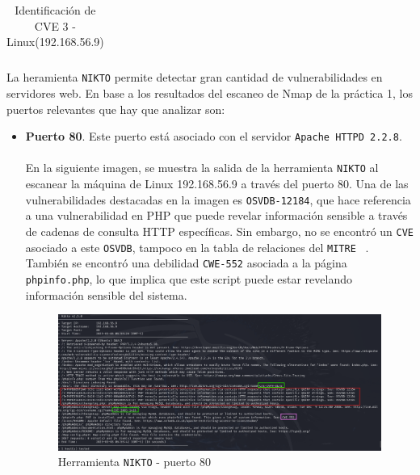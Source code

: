 \documentclass[a4paper,12pt]{article} %
\begin{document}
\begin{table}[hp!]
{\begin{tabular}{m{2.1cm}|m{2.6cm}|m{2cm}|m{4cm}|m{1cm}|m{3cm}|m{5cm}|m{5cm}}
  \end{tabular}}
  \caption{Identificación de CVE 3 - Linux(192.168.56.9)}
  \label{tab:linux3}
\end{table}



\newpage
    La heramienta \texttt{NIKTO}  permite detectar gran cantidad de vulnerabilidades en servidores web. En base a los resultados del escaneo de Nmap de la práctica 1, los puertos relevantes que hay que analizar son:
    \begin{itemize}
        \item \textbf{Puerto 80}. Este puerto está asociado con el servidor \texttt{Apache HTTPD 2.2.8}. 
        \\ \\
        En la siguiente imagen, se muestra la salida de la herramienta \texttt{NIKTO} al escanear la máquina de Linux 192.168.56.9 a través del puerto 80. Una de las vulnerabilidades destacadas en la imagen es \texttt{OSVDB-12184}, que hace referencia a una vulnerabilidad en PHP que puede revelar información sensible a través de cadenas de consulta HTTP específicas. Sin embargo, no se encontró un \texttt{CVE} asociado a este \texttt{OSVDB}, tampoco en la tabla de relaciones del \texttt{MITRE}  ~\cite{mitre}. También se encontró una debilidad \texttt{CWE-552} asociada a la página \texttt{phpinfo.php}, lo que implica que este script puede estar revelando información sensible del sistema.
            \begin{figure} [hp!]
             \centering
             \includegraphics[width=1\textwidth]{imagenes/nikto.png}
             \caption{Herramienta \texttt{NIKTO} - puerto 80}
             \label{fig:nikto80}
            \end{figure}


\end{itemize}
\end{document}
